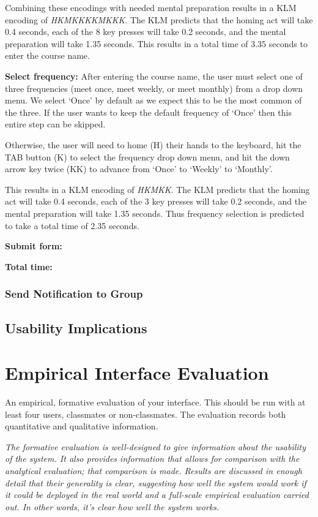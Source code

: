 \documentclass[conference]{IEEEtran}
\begin{document}
Combining these encodings with needed mental preparation results in a KLM encoding of \emph{HKMKKKKMKKK}.
The KLM predicts that the homing act will take 0.4 seconds, each of the 8 key presses will take 0.2 seconds, and the mental preparation will take 1.35 seconds.
This results in a total time of 3.35 seconds to enter the course name.

\textbf{Select frequency:}
After entering the course name, the user must select one of three frequencies (meet once, meet weekly, or meet monthly) from a drop down menu.
We select `Once' by default as we expect this to be the most common of the three.
If the user wants to keep the default frequency of `Once' then this entire step can be skipped.

Otherwise, the user will need to home (H) their hands to the keyboard, hit the TAB button (K) to select the frequency drop down menu, and hit the down arrow key twice (KK) to advance from `Once' to `Weekly' to `Monthly'.

This results in a KLM encoding of \emph{HKMKK}.
The KLM predicts that the homing act will take 0.4 seconds, each of the 3 key presses will take 0.2 seconds, and the mental preparation will take 1.35 seconds.
Thus frequency selection is predicted to take a total time of 2.35 seconds.

\textbf{Submit form:}

\textbf{Total time:}



\subsubsection{Send Notification to Group}



\subsection{Usability Implications}


\section{Empirical Interface Evaluation}
An empirical, formative evaluation of your interface. This should be run with at least four users, classmates or non-classmates. The evaluation records both quantitative and qualitative information. 

\emph{The formative evaluation is well-designed to give information about the usability of the system. It also provides information that allows for comparison with the analytical evaluation; that comparison is made. Results are discussed in enough detail that their generality is clear, suggesting how well the system would work if it could be deployed in the real world and a full-scale empirical evaluation carried out. In other words, it's clear how well the system works.}
\end{document}
